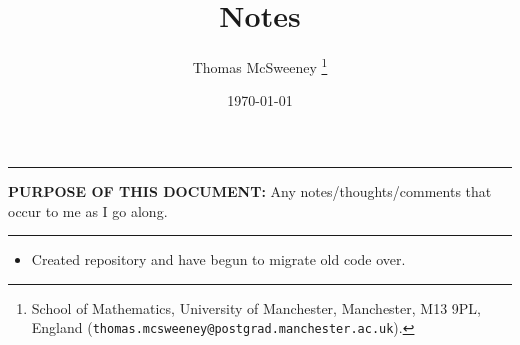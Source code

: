 \documentclass[12pt]{article}
\title{Notes}
\author{Thomas McSweeney%
        \thanks{%
                School of Mathematics,
                University of Manchester,
                Manchester, M13 9PL, England
                (\texttt{thomas.mcsweeney@postgrad.manchester.ac.uk}).
               }
}
\date{\today}
\begin{document}
\maketitle 

\noindent \rule{\linewidth}{0.4pt}
{\bf PURPOSE OF THIS DOCUMENT:} Any notes/thoughts/comments that occur to me as I go along.\\
\rule{\linewidth}{0.4pt}

\begin{itemize}
	\item Created repository and have begun to migrate old code over.
	
	
	
\end{itemize}



%
%
\end{document}
